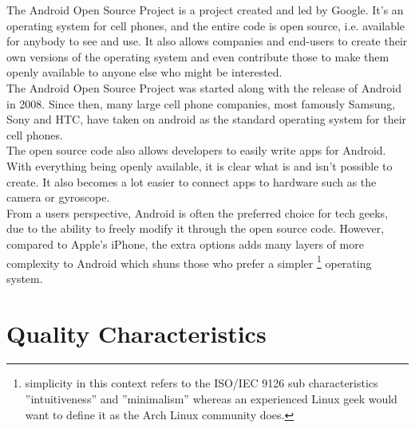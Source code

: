 \documentclass[conference]{IEEEtran}
\begin{document}
The Android Open Source Project is a project created and led by Google. It's an operating system for cell phones, and the entire code is open source, i.e. available for anybody to see and use. It also allows companies and end-users to create their own versions of the operating system and even contribute those to make them openly available to anyone else who might be interested.\cite{android} 
\\The Android Open Source Project was started along with the release of Android in 2008. Since then, many large cell phone companies, most famously Samsung, Sony and HTC, have taken on android as the standard operating system for their cell phones. 
\\The open source code also allows developers to easily write apps for Android. With everything being openly available, it is clear what is and isn't possible to create. It also becomes a lot easier to connect apps to hardware such as the camera or gyroscope.
\\From a users perspective, Android is often the preferred choice for tech geeks, due to the ability to freely modify it through the open source code. However, compared to Apple's iPhone, the extra options adds many layers of more complexity to Android which shuns those who prefer a simpler \footnote{simplicity in this context refers to the ISO/IEC 9126\cite{jung2004} sub characteristics ''intuitiveness'' and ''minimalism'' whereas an experienced Linux geek would want to define it as the Arch Linux community does.\cite{archway}} operating system. 

\section{Quality Characteristics}
\label{quality}
\end{document}

